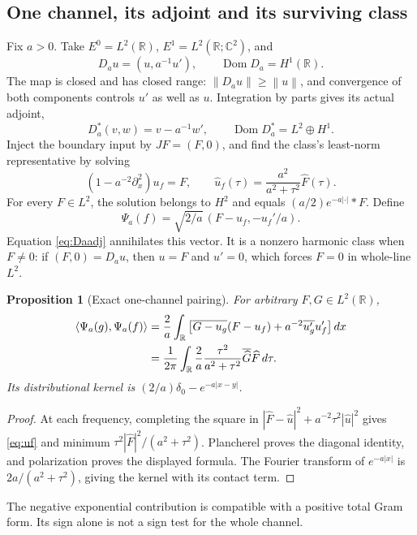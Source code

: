 \documentclass[11pt]{article}
\numberwithin{equation}{section}
\newtheorem{proposition}[theorem]{Proposition}
\theoremstyle{definition}
\theoremstyle{remark}
\newcommand{\R}{\mathbb R}
\newcommand{\C}{\mathbb C}
\newcommand{\Dom}{\operatorname{Dom}}
\newcommand{\norm}[1]{\left\lVert#1\right\rVert}
\newcommand{\ip}[2]{\left\langle#1,#2\right\rangle}
\begin{document}
\subsection{One channel, its adjoint and its surviving class}
Fix $a>0$. Take $E^0=L^2(\R)$, $E^1=L^2(\R;\C^2)$, and
\begin{equation}
 D_au=(u,a^{-1}u'),\qquad\Dom D_a=H^1(\R).
 \label{eq:Da}
\end{equation}
The map is closed and has closed range: $\norm{D_au}\ge\norm u$, and convergence of both components controls $u'$ as well as $u$. Integration by parts gives its actual adjoint,
\begin{equation}
 D_a^*(v,w)=v-a^{-1}w',\qquad\Dom D_a^*=L^2\oplus H^1.
 \label{eq:Daadj}
\end{equation}
Inject the boundary input by $JF=(F,0)$, and find the class's least-norm representative by solving
\begin{equation}
 (1-a^{-2}\partial_x^2)u_f=F,
 \qquad
 \widehat u_f(\tau)=\frac{a^2}{a^2+\tau^2}\widehat F(\tau).
 \label{eq:uf}
\end{equation}
For every $F\in L^2$, the solution belongs to $H^2$ and equals $(a/2)e^{-a|\cdot|}*F$. Define
\begin{equation}
 \Psi_a(f)=\sqrt{2/a}\,(F-u_f,-u_f'/a).
 \label{eq:psia}
\end{equation}
Equation \eqref{eq:Daadj} annihilates this vector. It is a nonzero harmonic class when $F\ne0$: if $(F,0)=D_au$, then $u=F$ and $u'=0$, which forces $F=0$ in whole-line $L^2$.

\begin{proposition}[Exact one-channel pairing]
For arbitrary $F,G\in L^2(\R)$,
\begin{align}
 \ip{\Psi_a(g)}{\Psi_a(f)}
 &=\frac2a\int_\R\left[\overline{G-u_g}(F-u_f)
             +a^{-2}\overline{u_g'}u_f'\right]dx\notag\\
 &=\frac1{2\pi}\int_\R\frac2a\frac{\tau^2}{a^2+\tau^2}
       \overline{\widehat G}\widehat F\,d\tau.
 \label{eq:paira}
\end{align}
Its distributional kernel is $(2/a)\delta_0-e^{-a|x-y|}$.
\end{proposition}
\begin{proof}
At each frequency, completing the square in
$|\widehat F-\widehat u|^2+a^{-2}\tau^2|\widehat u|^2$
gives \eqref{eq:uf} and minimum $\tau^2|\widehat F|^2/(a^2+\tau^2)$. Plancherel proves the diagonal identity, and polarization proves the displayed formula. The Fourier transform of $e^{-a|x|}$ is $2a/(a^2+\tau^2)$, giving the kernel with its contact term.
\end{proof}
The negative exponential contribution is compatible with a positive total Gram form. Its sign alone is not a sign test for the whole channel.
\end{document}
